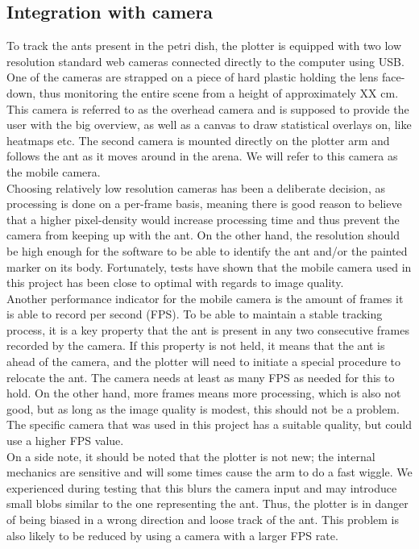 
\subsection{Integration with camera}

To track the ants present in the petri dish, the plotter is equipped with two low resolution standard web cameras connected directly to the computer using USB. One of the cameras are strapped on a piece of hard plastic holding the lens face-down, thus monitoring the entire scene from a height of approximately XX cm. This camera is referred to as the overhead camera and is supposed to provide the user with the big overview, as well as a canvas to draw statistical overlays on, like heatmaps etc. The second camera is mounted directly on the plotter arm and follows the ant as it moves around in the arena. We will refer to this camera as the mobile camera. \\

Choosing relatively low resolution cameras has been a deliberate decision, as processing is done on a per-frame basis, meaning there is good reason to believe that a higher pixel-density would increase processing time and thus prevent the camera from keeping up with the ant. On the other hand, the resolution should be high enough for the software to be able to identify the ant and/or the painted marker on its body. Fortunately, tests have shown that the mobile camera used in this project has been close to optimal with regards to image quality. \\

Another performance indicator for the mobile camera is the amount of frames it is able to record per second (FPS). To be able to maintain a stable tracking process, it is a key property that the ant is present in any two consecutive frames recorded by the camera. If this property is not held, it means that the ant is ahead of the camera, and the plotter will need to initiate a special procedure to relocate the ant. The camera needs at least as many FPS as needed for this to hold. On the other hand, more frames means more processing, which is also not good, but as long as the image quality is modest, this should not be a problem. The specific camera that was used in this project has a suitable quality, but could use a higher FPS value. \\

On a side note, it should be noted that the plotter is not new; the internal mechanics are sensitive and will some times cause the arm to do a fast wiggle. We experienced during testing that this blurs the camera input and may introduce small blobs similar to the one representing the ant. Thus, the plotter is in danger of being biased in a wrong direction and loose track of the ant. This problem is also likely to be reduced by using a camera with a larger FPS rate.

